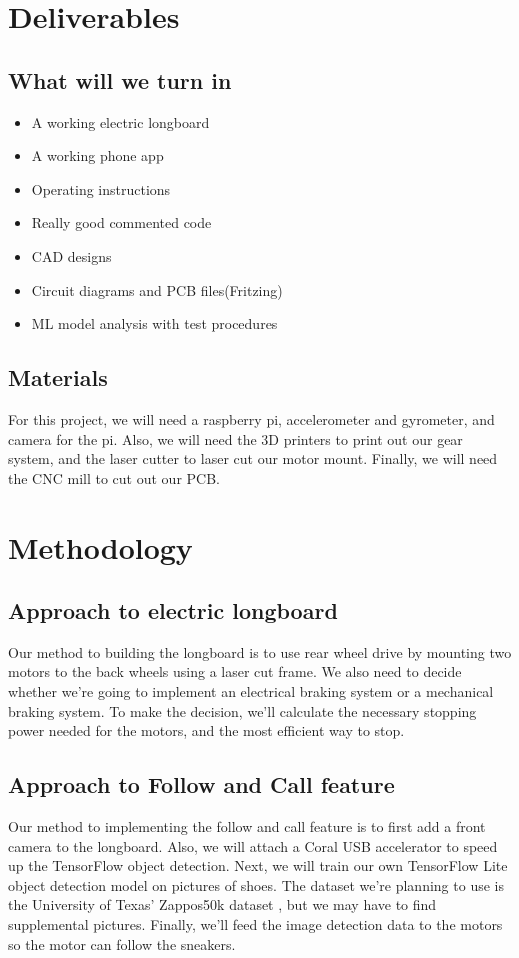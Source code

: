 \documentclass{article}
\begin{document}
\section{Deliverables}
\subsection{What will we turn in}
\begin{itemize}
    \item A working electric longboard
    \item A working phone app
    \item Operating instructions
    \item Really good commented code
    \item CAD designs
    \item Circuit diagrams and PCB files(Fritzing)
    \item ML model analysis with test procedures
\end{itemize}
\subsection{Materials}
For this project, we will need a raspberry pi, accelerometer and gyrometer, and camera for the pi. Also, we will need the 3D printers to print out our gear system, and the laser cutter to laser cut our motor mount. Finally, we will need the CNC mill to cut out our PCB.
\section{Methodology}
\subsection{Approach to electric longboard}
Our method to building the longboard is to use rear wheel drive by mounting two motors to the back wheels using a laser cut frame. We also need to decide whether we're going to implement an electrical braking system or a mechanical braking system. To make the decision, we'll calculate the necessary stopping power needed for the motors, and the most efficient way to stop.
\subsection{Approach to Follow and Call feature}
Our method to implementing the follow and call feature is to first add a front camera to the longboard. Also, we will attach a Coral USB accelerator to speed up the TensorFlow object detection. Next, we will train our own TensorFlow Lite object detection model on pictures of shoes. \cite{Trainown} The dataset we're planning to use is the University of Texas' Zappos50k dataset \cite{finegrained} \cite{semjitter}, but we may have to find supplemental pictures. Finally, we'll feed the image detection data to the motors so the motor can follow the sneakers.
\end{document}
